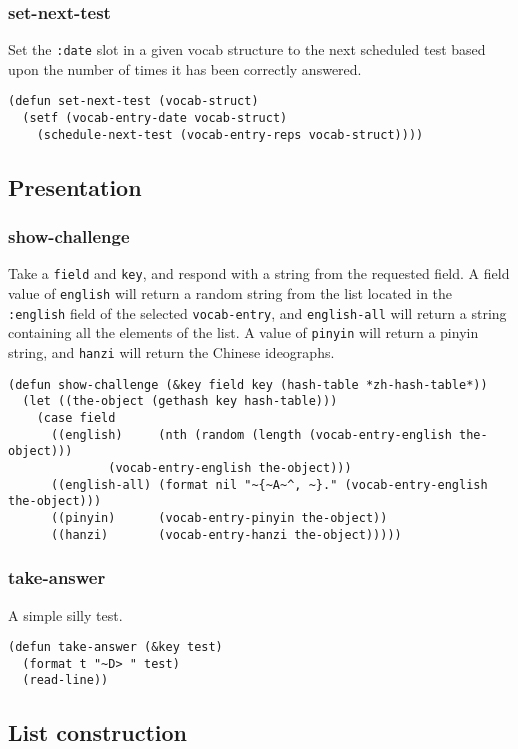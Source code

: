 \documentclass[11pt]{article}
\begin{document}
\subsubsection*{set-next-test}
\label{sec-8-7-4}
Set the \texttt{:date} slot in a given vocab structure to the next scheduled test based
upon the number of times it has been correctly answered.
\begin{verbatim}
(defun set-next-test (vocab-struct)
  (setf (vocab-entry-date vocab-struct)
	(schedule-next-test (vocab-entry-reps vocab-struct))))
\end{verbatim}
\subsection{Presentation}
\label{sec-8-8}
\subsubsection*{show-challenge}
\label{sec-8-8-1}
Take a \texttt{field} and \texttt{key}, and respond with a string from the requested
field. A field value of \texttt{english} will return a random string from the list
located in the \texttt{:english} field of the selected \texttt{vocab-entry}, and \texttt{english-all}
will return a string containing all the elements of the list. A value of
\texttt{pinyin} will return a pinyin string, and \texttt{hanzi} will return the Chinese
ideographs.
\begin{verbatim}
(defun show-challenge (&key field key (hash-table *zh-hash-table*))
  (let ((the-object (gethash key hash-table)))
    (case field
      ((english)     (nth (random (length (vocab-entry-english the-object)))
			  (vocab-entry-english the-object)))
      ((english-all) (format nil "~{~A~^, ~}." (vocab-entry-english the-object)))
      ((pinyin)      (vocab-entry-pinyin the-object))
      ((hanzi)       (vocab-entry-hanzi the-object)))))
\end{verbatim}
\subsubsection*{take-answer}
\label{sec-8-8-2}
A simple silly test.
\begin{verbatim}
(defun take-answer (&key test)
  (format t "~D> " test)
  (read-line))
\end{verbatim}
\subsection{List construction}
\label{sec-8-9}
\end{document}
